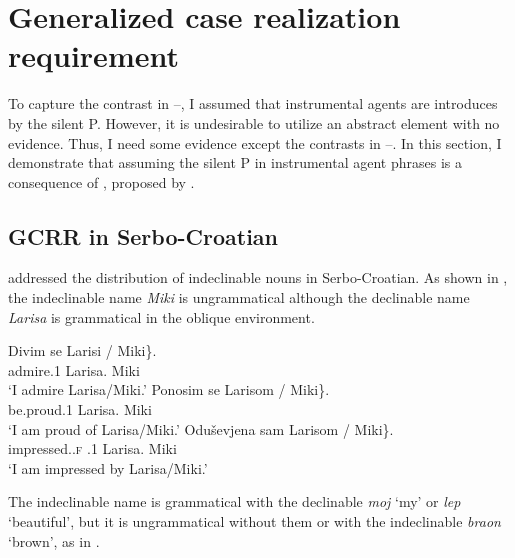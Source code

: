 \documentclass[output=paper,colorlinks,citecolor=brown,newtxmath]{langsci/langscibook}
\begin{document}
\section{Generalized case realization requirement}\label{sec:GCRR}

To capture the contrast in --, I assumed that instrumental agents are introduces by the silent P.
However, it is undesirable to utilize an abstract element with no evidence.
Thus, I need some evidence except the contrasts in --.
In this section, I demonstrate that assuming the silent P in instrumental agent phrases is a consequence of , proposed by \citet{Horvath2014}.


\subsection{GCRR in Serbo-Croatian}


\citet{Horvath2014} addressed the distribution of indeclinable nouns in Serbo-Cro\-a\-tian.
As shown in ,
the indeclinable name \textit{Miki} is ungrammatical although the declinable name \textit{Larisa} is grammatical in the oblique environment.

\begin{exe}
\ex\label{SCind}
\begin{xlist}
\ex
\gll	Divim se \minsp{\{} Larisi / \minsp{*} Miki\}.\\
		admire.1{\SG} {\REFL} {} Larisa.{\DAT} {} {} Miki\\
\trans	`I admire Larisa/Miki.'
\ex
\gll	Ponosim se \minsp{\{} Larisom / \minsp{*} Miki\}.\\
		be.proud.1{\SG} {\REFL} {} Larisa.{\INS} {} {} Miki\\
\trans	`I am proud of Larisa/Miki.'
\ex
\gll	Oduševjena sam \minsp{\{} Larisom / \minsp{*} Miki\}.\\
		impressed.{\PTCP}.\textsc{f} {\AUX}.1{\SG} {} Larisa.{\INS} {} {} Miki\\\samepage
\trans	`I am impressed by Larisa/Miki.'
\hfill\citep[121]{Horvath2014}
\end{xlist}
\end{exe}

\noindent
The indeclinable name is grammatical with the declinable  \textit{moj} `my' or  \textit{lep} `beautiful', but it is ungrammatical without them or with the indeclinable  \textit{braon} `brown', as in .
\end{document}
